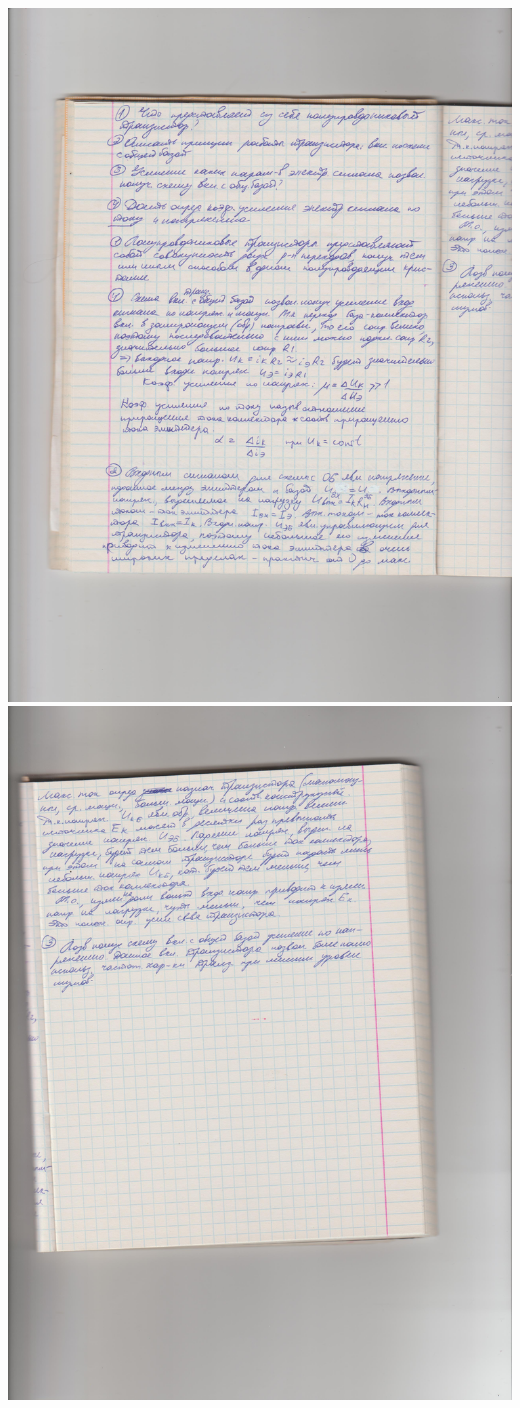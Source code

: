 \documentclass[12pt]{article}
\begin{document}
\includegraphics {133_9.jpeg}\\
\includegraphics {133_10.jpeg}
\end{document}
